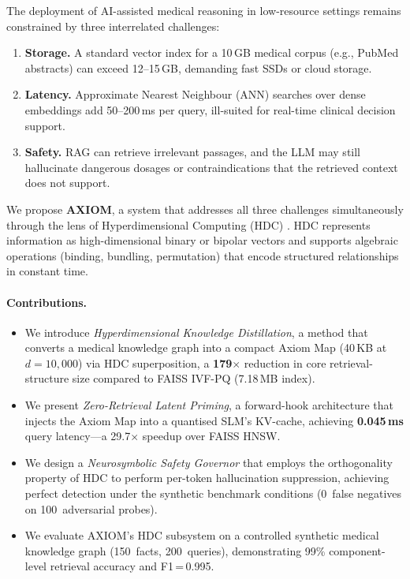 \documentclass[11pt,a4paper]{article}
\begin{document}
The deployment of AI-assisted medical reasoning in low-resource settings
remains constrained by three interrelated challenges:

\begin{enumerate}[nosep]
    \item \textbf{Storage.}  A standard vector index for a 10\,GB medical
          corpus (e.g., PubMed abstracts) can exceed 12--15\,GB, demanding
          fast SSDs or cloud storage.
    \item \textbf{Latency.}  Approximate Nearest Neighbour (ANN) searches
          over dense embeddings add 50--200\,ms per query, ill-suited for
          real-time clinical decision support.
    \item \textbf{Safety.}  RAG can retrieve irrelevant passages, and the
          LLM may still hallucinate dangerous dosages or contraindications
          that the retrieved context does not support.
\end{enumerate}

We propose \textbf{AXIOM}, a system that addresses all three challenges
simultaneously through the lens of Hyperdimensional Computing (HDC)
\citep{kanerva2009hyperdimensional}.  HDC represents information as
high-dimensional binary or bipolar vectors and supports algebraic operations
(binding, bundling, permutation) that encode structured relationships in
constant time.

\paragraph{Contributions.}
\begin{itemize}[nosep]
    \item We introduce \emph{Hyperdimensional Knowledge Distillation}, a
          method that converts a medical knowledge graph into a compact
          Axiom Map (40\,KB at $d = 10{,}000$) via HDC superposition,
          a \textbf{179$\times$} reduction in core retrieval-structure
          size compared to FAISS IVF-PQ (7.18\,MB index).
    \item We present \emph{Zero-Retrieval Latent Priming}, a forward-hook
          architecture that injects the Axiom Map into a quantised SLM's
          KV-cache, achieving \textbf{0.045\,ms} query latency---a
          29.7$\times$ speedup over FAISS HNSW.
    \item We design a \emph{Neurosymbolic Safety Governor} that employs the
          orthogonality property of HDC to perform per-token hallucination
          suppression, achieving perfect detection under the synthetic
          benchmark conditions (0~false negatives on 100~adversarial probes).
    \item We evaluate AXIOM's HDC subsystem on a controlled synthetic
          medical knowledge graph (150~facts, 200~queries), demonstrating
          99\% component-level retrieval accuracy and F1\,=\,0.995.
\end{itemize}
\end{document}

